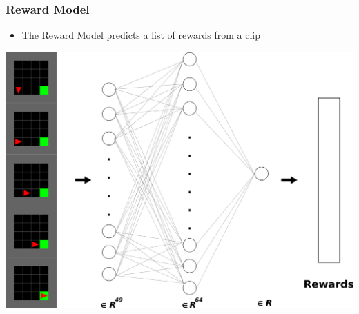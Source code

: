 \begin{frame}
\frametitle{Reward Model}
\begin{itemize}
    \item The Reward Model predicts a list of rewards from a clip
\end{itemize}
\vspace{0.3cm}
\centering
\includegraphics[width=0.55\linewidth]{images/reward.png}
\end{frame}

